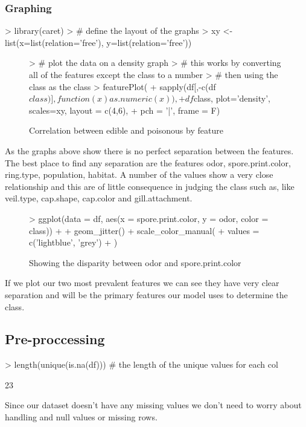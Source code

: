 \documentclass[10pt]{article}         %
\begin{document}
\subsubsection{Graphing}
\begin{Schunk}
\begin{Sinput}
> library(caret)
> # define the layout of the graphs
> xy <- list(x=list(relation='free'), y=list(relation='free'))
\end{Sinput}
\end{Schunk}
\begin{figure}[H]
\begin{center}
\begin{Schunk}
\begin{Sinput}
> # plot the data on a density graph
> # this works by converting all of the features except the class to a number
> #  then using the class as the class
> featurePlot(
+ 	sapply(df[,-c(df$class)], function (x) as.numeric(x)),
+ 	df$class, plot='density', scales=xy, layout = c(4,6),
+ 	pch = '|', frame = F)
\end{Sinput}
\end{Schunk}
\caption {Correlation between edible and poisonous by feature}
\label{fig2}
\end {center}
\end {figure}
As the graphs above show there is no perfect separation between the features. The best place to find any separation are the features odor, spore.print.color, ring.type, population, habitat. A number of the values show a very close relationship and this are of little consequence in judging the class such as, like veil.type, cap.shape, cap.color and gill.attachment.
\pagebreak\begin{figure}[H]
\begin{center}
\begin{Schunk}
\begin{Sinput}
> ggplot(data = df, aes(x = spore.print.color, y = odor, color = class)) + 
+ 	geom_jitter() + scale_color_manual(
+ 		values = c('lightblue', 'grey')
+ 	)
\end{Sinput}
\end{Schunk}
\caption {Showing the disparity between odor and spore.print.color}
\label{fig3}
\end {center}
\end {figure}
If we plot our two most prevalent features we can see they have very clear separation and will be the primary features our model uses to determine the class.
\pagebreak\subsection{Pre-proccessing}
\begin{Schunk}
\begin{Sinput}
> length(unique(is.na(df))) # the length of the unique values for each col
\end{Sinput}
\begin{Soutput}
[1] 23
\end{Soutput}
\end{Schunk}
Since our dataset doesn't have any missing values we don't need to worry about handling and null values or missing rows.
\end{document}
